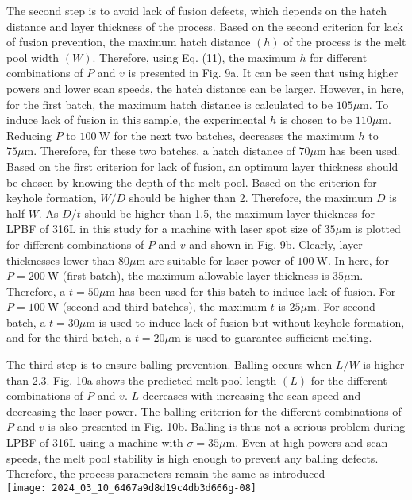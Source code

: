 \documentclass[10pt]{article}
\begin{document}
The second step is to avoid lack of fusion defects, which depends on the hatch distance and layer thickness of the process. Based on the second criterion for lack of fusion prevention, the maximum hatch distance $(h)$ of the process is the melt pool width $(W)$. Therefore, using Eq. (11), the maximum $h$ for different combinations of $P$ and $v$ is presented in Fig. 9a. It can be seen that using higher powers and lower scan speeds, the hatch distance can be larger. However, in here, for the first batch, the maximum hatch distance is calculated to be $105 \mu \mathrm{m}$. To induce lack of fusion in this sample, the experimental $h$ is chosen to be $110 \mu \mathrm{m}$. Reducing $P$ to $100 \mathrm{~W}$ for the next two batches, decreases the maximum $h$ to $75 \mu \mathrm{m}$. Therefore, for these two batches, a hatch distance of $70 \mu \mathrm{m}$ has been used. Based on the first criterion for lack of fusion, an optimum layer thickness should be chosen by knowing the depth of the melt pool. Based on the criterion for keyhole formation, $W / D$ should be higher than 2. Therefore, the maximum $D$ is half $W$. As $D / t$ should be higher than 1.5, the maximum layer thickness for LPBF of 316L in this study for a machine with laser spot size of $35 \mu \mathrm{m}$ is plotted for different combinations of $P$ and $v$ and shown in Fig. 9b. Clearly, layer thicknesses lower than $80 \mu \mathrm{m}$ are suitable for laser power of $100 \mathrm{~W}$. In here, for $P=200 \mathrm{~W}$ (first batch), the maximum allowable layer thickness is $35 \mu \mathrm{m}$. Therefore, a $t=50 \mu \mathrm{m}$ has been used for this batch to induce lack of fusion. For $P=100 \mathrm{~W}$ (second and third batches), the maximum $t$ is $25 \mu \mathrm{m}$. For second batch, a $t=30 \mu \mathrm{m}$ is used to induce lack of fusion but without keyhole formation, and for the third batch, a $t=20 \mu \mathrm{m}$ is used to guarantee sufficient melting.

The third step is to ensure balling prevention. Balling occurs when $L / W$ is higher than 2.3. Fig. 10a shows the predicted melt pool length $(L)$ for the different combinations of $P$ and $v$. $L$ decreases with increasing the scan speed and decreasing the laser power. The balling criterion for the different combinations of $P$ and $v$ is also presented in Fig. 10b. Balling is thus not a serious problem during LPBF of 316L using a machine with $\sigma=35 \mu \mathrm{m}$. Even at high powers and scan speeds, the melt pool stability is high enough to prevent any balling defects. Therefore, the process parameters remain the same as introduced\\
\texttt{[image: 2024\_03\_10\_6467a9d8d19c4db3d666g-08]}
\end{document}
